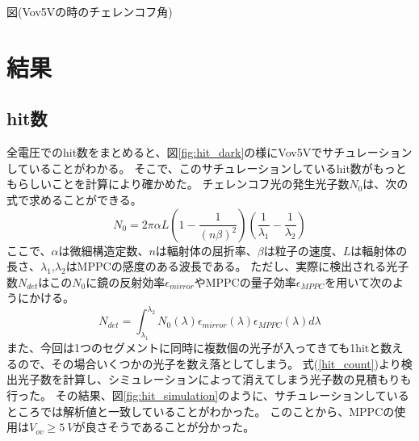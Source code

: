 \documentclass[uplatex, titlepage, dvipdfmx, 12pt, a4paper]{jsreport}
\begin{document}
      図(Vov5Vの時のチェレンコフ角)\\

\chapter{結果}
  \section{hit数}
    全電圧でのhit数をまとめると、図\ref{fig:hit_dark}の様にVov5Vでサチュレーションしていることがわかる。
    そこで、このサチュレーションしているhit数がもっともらしいことを計算により確かめた。
    チェレンコフ光の発生光子数$N_{0}$は、次の式で求めることができる。
    \begin{equation}
        N_{0} = 2 \pi \alpha L  \left(1 - \frac{1}{(n\beta)^2}\right) \left(\frac{1}{\lambda_{1}} - \frac{1}{\lambda_{2}}\right)
    \end{equation}
    ここで、$\alpha$は微細構造定数、$n$は輻射体の屈折率、$\beta$は粒子の速度、$L$は輻射体の長さ、$\lambda_{1}$,$\lambda_{2}$はMPPCの感度のある波長である。
    ただし、実際に検出される光子数$N_{det}$はこの$N_{0}$に鏡の反射効率$\epsilon_{mirror}$やMPPCの量子効率$\epsilon_{MPPC}$を用いて次のようにかける。
    \begin{equation}
        N_{det} = \int^{\lambda_2}_{\lambda_1} N_{0}\left(\lambda\right) \epsilon_{mirror}\left(\lambda\right) \epsilon_{MPPC}\left(\lambda\right) d\lambda
        \label{hit_count}
    \end{equation}
    また、今回は1つのセグメントに同時に複数個の光子が入ってきても1hitと数えるので、その場合いくつかの光子を数え落としてしまう。
    式(\ref{hit_count})より検出光子数を計算し、シミュレーションによって消えてしまう光子数の見積もりも行った。
    その結果、図\ref{fig:hit_simulation}のように、サチュレーションしているところでは解析値と一致していることがわかった。
    このことから、MPPCの使用は$V_{ov} \ge \SI{5}{V}$が良さそうであることが分かった。
\end{document}
